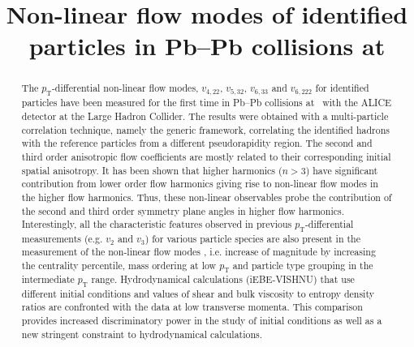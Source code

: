 \documentclass[ALICE,manyauthors]{cernphprep}
\begin{document}


\begin{titlepage}

\title{Non-linear flow modes of identified particles in Pb--Pb collisions at \sNN}


\begin{abstract}
\noindent The $p_{\mathrm{T}}$-differential non-linear flow modes, $v_{4,22}$, $v_{5,32}$, $v_{6,33}$ and $v_{6,222}$ for identified particles have been measured for the first time in Pb--Pb collisions at \sNN~with the ALICE detector at the Large Hadron Collider. The results were obtained with a multi-particle correlation technique, namely the generic framework, correlating the identified hadrons with the reference particles from a different pseudorapidity region. The second and third order anisotropic flow coefficients are mostly related to their corresponding initial spatial anisotropy. It has been shown that higher harmonics ($n > 3$) have significant contribution from lower order flow harmonics giving rise to non-linear flow modes in the higher flow harmonics. Thus, these non-linear observables probe the contribution of the second and third order symmetry plane angles in higher flow harmonics. Interestingly, all the characteristic features observed in previous $p_{\mathrm{T}}$-differential measurements (e.g. $v_{2}$ and $v_{3}$) for various particle species are also present in the measurement of the non-linear flow modes , i.e. increase of magnitude by increasing the centrality percentile, mass ordering at low $p_{\mathrm{T}}$ and particle type grouping in the intermediate $p_{\mathrm{T}}$ range. Hydrodynamical calculations (iEBE-VISHNU) that use different initial conditions and values of shear and bulk viscosity to entropy density ratios are confronted with the data at low transverse momenta. This comparison provides increased discriminatory power in the study of initial conditions as well as a new stringent constraint to hydrodynamical calculations.


\end{abstract}
\end{titlepage}
\end{document}
